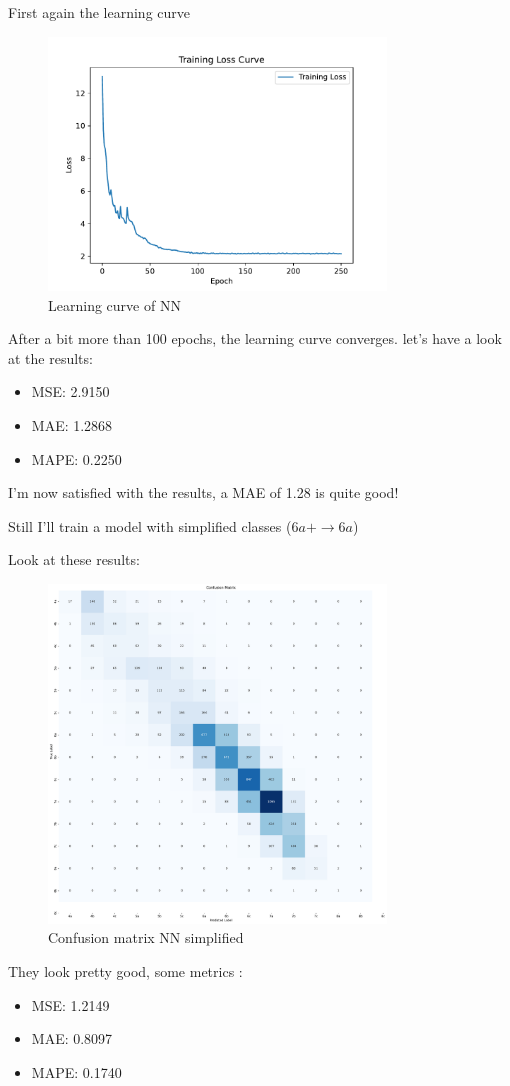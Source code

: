 \documentclass{article}
\begin{document}
First again the learning curve
\begin{figure}[H]
    \centering    
    \includegraphics[width=0.8\textwidth]{../Models/NN_reduced_linear/nn_learning_curve_epoch_251.pdf}
    \caption{Learning curve of NN}\label{fig:learning_curve_nn}
\end{figure}
After a bit more than 100 epochs, the learning curve converges.
let's have a look at the results:

\begin{itemize}
    \item MSE: 2.9150
    \item MAE: 1.2868
    \item MAPE: 0.2250
\end{itemize}

I'm now satisfied with the results, a MAE of 1.28 is quite good!

Still I'll train a model with simplified classes ($6a+ \rightarrow 6a$)

Look at these results:

\begin{figure}[H]
    \centering    
    \includegraphics[width=0.8\textwidth]{../Models/NN_reduced_linear/confusion_matrix_simplified.pdf}
    \caption{Confusion matrix NN simplified}\label{fig:conf_nn_red_simpl}
\end{figure}

They look pretty good, some metrics :
\begin{itemize}
    \item MSE: 1.2149
    \item MAE: 0.8097
    \item MAPE: 0.1740
\end{itemize}
\end{document}
